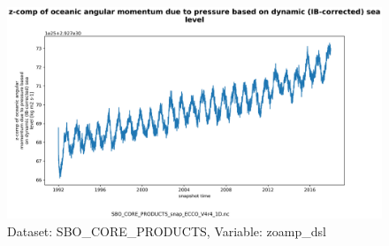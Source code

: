 \begin{figure}[H]
\centering
\includegraphics[scale=0.55]{../images/plots/v4r4/oneD_plots/SBO_Core_Products/zoamp_dsl.png}
\caption{Dataset: SBO\_CORE\_PRODUCTS, Variable: zoamp\_dsl}
\label{tab:table-SBO_CORE_PRODUCTS_zoamp_dsl-Plot}
\end{figure}
\newpage
\pagebreak
